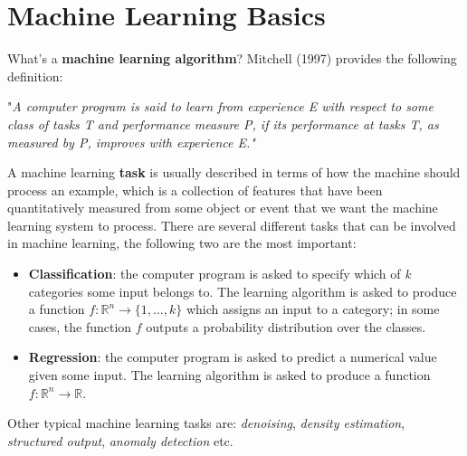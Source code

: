 \section{Machine Learning Basics}
What's a \textbf{machine learning algorithm}? Mitchell (1997) provides the following definition: 

\begin{displayquote}
    "\textit{A computer program is said to learn from experience E with respect to some class of tasks T and performance measure P, if its performance at tasks T, as measured by P, improves with experience E."}
\end{displayquote}

A machine learning \textbf{task} is usually described in terms of how the machine should process an example, which is a collection of features that have been quantitatively measured from some object or event that we want the machine learning system to process. There are several different tasks that can be involved in machine learning, the following two are the most important:
\begin{itemize}
    \item \textbf{Classification}: the computer program is asked to specify which of \textit{k} categories some input belongs to. The learning algorithm is asked to produce a function $f : \mathbb{R}^n \to \{1,...,k\}$ which assigns an input to a category; in some cases, the function $f$ outputs a probability distribution over the classes.
    \item \textbf{Regression}: the computer program is asked to predict a numerical value given some input. The learning algorithm is asked to produce a function $f : \mathbb{R}^n \to \mathbb{R}$.
\end{itemize}
Other typical machine learning tasks are: \textit{denoising}, \textit{density estimation}, \textit{structured output}, \textit{anomaly detection} etc. 

